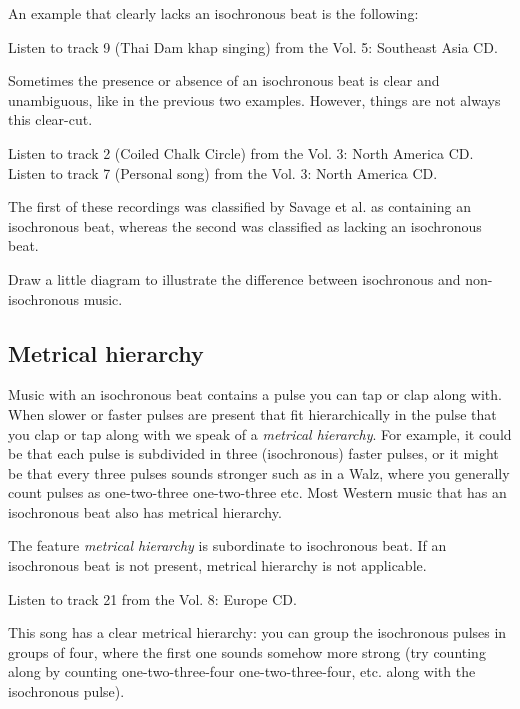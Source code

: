 \documentclass[a4paper, 9pt]{article}
\begin{document}
An example that clearly lacks an isochronous beat is the following:

\begin{exercise}
\action Listen to track 9 (Thai Dam khap  singing) from the Vol. 5: Southeast Asia CD.
\end{exercise}

Sometimes the presence or absence of an isochronous beat is clear and
unambiguous, like in the previous two examples. However, things are not
always this clear-cut.

\begin{exercise}
\action Listen to track 2 (Coiled Chalk Circle) from the Vol. 3: North America CD.
\action Listen to track 7 (Personal song) from the Vol. 3: North America CD.
\end{exercise}

The first of these recordings was classified by Savage et al. as
containing an isochronous beat, whereas the second was classified as
lacking an isochronous beat.

\begin{exercise}
\askstar Draw a little diagram to illustrate the difference between isochronous and non-isochronous music. 
\end{exercise}

\subsection{Metrical hierarchy}\label{metrical-hierarchy}

Music with an isochronous beat contains a pulse you can tap or clap
along with. When slower or faster pulses are present that fit
hierarchically in the pulse that you clap or tap along with we speak of
a \emph{metrical hierarchy}. For example, it could be that each pulse is
subdivided in three (isochronous) faster pulses, or it might be that
every three pulses sounds stronger such as in a Walz, where you
generally count pulses as one-two-three one-two-three etc. Most Western
music that has an isochronous beat also has metrical hierarchy.

The feature \emph{metrical hierarchy} is subordinate to isochronous
beat. If an isochronous beat is not present, metrical hierarchy is not
applicable.

\begin{exercise}
\action Listen to track 21 from the Vol. 8: Europe CD.
\end{exercise}

This song has a clear metrical hierarchy: you can group the isochronous
pulses in groups of four, where the first one sounds somehow more strong
(try counting along by counting one-two-three-four one-two-three-four,
etc. along with the isochronous pulse).
\end{document}
